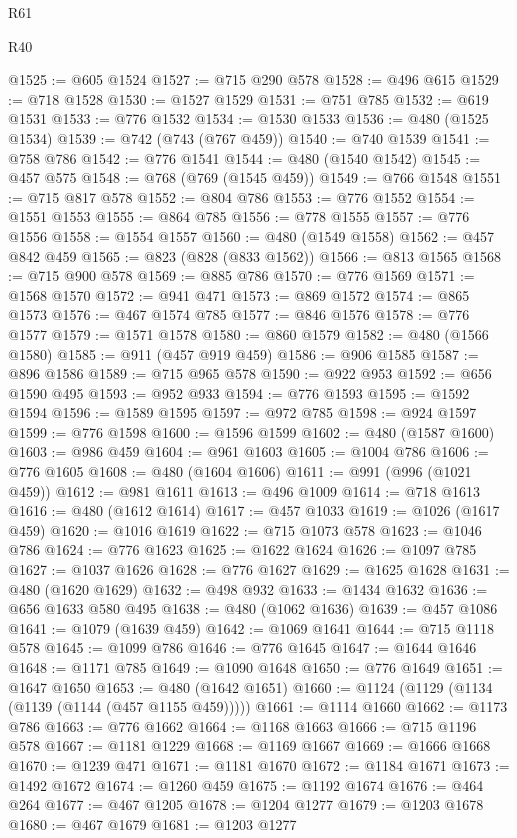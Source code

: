 \begin{lexlean}{R61}
\begin{lexlean}{R40}
\begin{coremodule}
{{{{{{{{{{{{{{{{{{{{{{{{{{{{{{{{{{{{{{{{{{{{{{{{{{{{{{{{{{{{{{{{{{{{{{{{{{{{{{{{{{{{{{{{{{{{{{{{{{{{{{{{{{{{{@1525 := @605 @1524
@1527 := @715 @290 @578
@1528 := @496 @615
@1529 := @718 @1528
@1530 := @1527 @1529
@1531 := @751 @785
@1532 := @619 @1531
@1533 := @776 @1532
@1534 := @1530 @1533
@1536 := @480 (@1525 @1534)
@1539 := @742 (@743 (@767 @459))
@1540 := @740 @1539
@1541 := @758 @786
@1542 := @776 @1541
@1544 := @480 (@1540 @1542)
@1545 := @457 @575
@1548 := @768 (@769 (@1545 @459))
@1549 := @766 @1548
@1551 := @715 @817 @578
@1552 := @804 @786
@1553 := @776 @1552
@1554 := @1551 @1553
@1555 := @864 @785
@1556 := @778 @1555
@1557 := @776 @1556
@1558 := @1554 @1557
@1560 := @480 (@1549 @1558)
@1562 := @457 @842 @459
@1565 := @823 (@828 (@833 @1562))
@1566 := @813 @1565
@1568 := @715 @900 @578
@1569 := @885 @786
@1570 := @776 @1569
@1571 := @1568 @1570
@1572 := @941 @471
@1573 := @869 @1572
@1574 := @865 @1573
@1576 := @467 @1574 @785
@1577 := @846 @1576
@1578 := @776 @1577
@1579 := @1571 @1578
@1580 := @860 @1579
@1582 := @480 (@1566 @1580)
@1585 := @911 (@457 @919 @459)
@1586 := @906 @1585
@1587 := @896 @1586
@1589 := @715 @965 @578
@1590 := @922 @953
@1592 := @656 @1590 @495
@1593 := @952 @933
@1594 := @776 @1593
@1595 := @1592 @1594
@1596 := @1589 @1595
@1597 := @972 @785
@1598 := @924 @1597
@1599 := @776 @1598
@1600 := @1596 @1599
@1602 := @480 (@1587 @1600)
@1603 := @986 @459
@1604 := @961 @1603
@1605 := @1004 @786
@1606 := @776 @1605
@1608 := @480 (@1604 @1606)
@1611 := @991 (@996 (@1021 @459))
@1612 := @981 @1611
@1613 := @496 @1009
@1614 := @718 @1613
@1616 := @480 (@1612 @1614)
@1617 := @457 @1033
@1619 := @1026 (@1617 @459)
@1620 := @1016 @1619
@1622 := @715 @1073 @578
@1623 := @1046 @786
@1624 := @776 @1623
@1625 := @1622 @1624
@1626 := @1097 @785
@1627 := @1037 @1626
@1628 := @776 @1627
@1629 := @1625 @1628
@1631 := @480 (@1620 @1629)
@1632 := @498 @932
@1633 := @1434 @1632
@1636 := @656 @1633 @580 @495
@1638 := @480 (@1062 @1636)
@1639 := @457 @1086
@1641 := @1079 (@1639 @459)
@1642 := @1069 @1641
@1644 := @715 @1118 @578
@1645 := @1099 @786
@1646 := @776 @1645
@1647 := @1644 @1646
@1648 := @1171 @785
@1649 := @1090 @1648
@1650 := @776 @1649
@1651 := @1647 @1650
@1653 := @480 (@1642 @1651)
@1660 := @1124 (@1129 (@1134 (@1139 (@1144 (@457 @1155 @459)))))
@1661 := @1114 @1660
@1662 := @1173 @786
@1663 := @776 @1662
@1664 := @1168 @1663
@1666 := @715 @1196 @578
@1667 := @1181 @1229
@1668 := @1169 @1667
@1669 := @1666 @1668
@1670 := @1239 @471
@1671 := @1181 @1670
@1672 := @1184 @1671
@1673 := @1492 @1672
@1674 := @1260 @459
@1675 := @1192 @1674
@1676 := @464 @264
@1677 := @467 @1205
@1678 := @1204 @1277
@1679 := @1203 @1678
@1680 := @467 @1679
@1681 := @1203 @1277
}}}}}}}}}}}}}}}}}}}}}}}}}}}}}}}}}}}}}}}}}}}}}}}}}}}}}}}}}}}}}}}}}}}}}}}}}}}}}}}}}}}}}}}}}}}}}}}}}}}}}}}}}}}}}
\end{coremodule}
\end{lexlean}
\end{lexlean}
